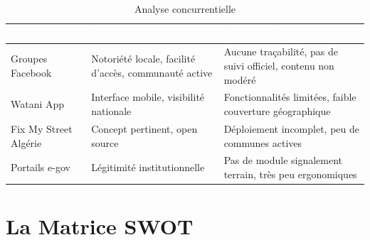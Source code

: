 \documentclass[12pt,a4paper]{report}
\newcommand{\thdcell}[1]{%
  \cellcolor{tabhead}\textbf{\textcolor{white}{#1}}%
}
\begin{document}
\begin{table}[H]
  \centering
  \caption{Analyse concurrentielle}
  \renewcommand{\arraystretch}{1.4}
  \begin{tabularx}{\linewidth}{lXX}
    \toprule
    \rowcolor{primary}
    \thdcell{Concurrent} & \thdcell{Points forts} & \thdcell{Points faibles} \\
    \midrule

    Groupes Facebook &
    Notoriété locale, facilité d'accès, communauté active &
    Aucune traçabilité, pas de suivi officiel, contenu non modéré \\

    \rowcolor{lightgray}
    Watani App &
    Interface mobile, visibilité nationale &
    Fonctionnalités limitées, faible couverture géographique \\

    Fix My Street Algérie &
    Concept pertinent, open source &
    Déploiement incomplet, peu de communes actives \\

    \rowcolor{lightgray}
    Portails e-gov &
    Légitimité institutionnelle &
    Pas de module signalement terrain, très peu ergonomiques \\

    \bottomrule
  \end{tabularx}
\end{table}

\section{La Matrice SWOT}
\end{document}

